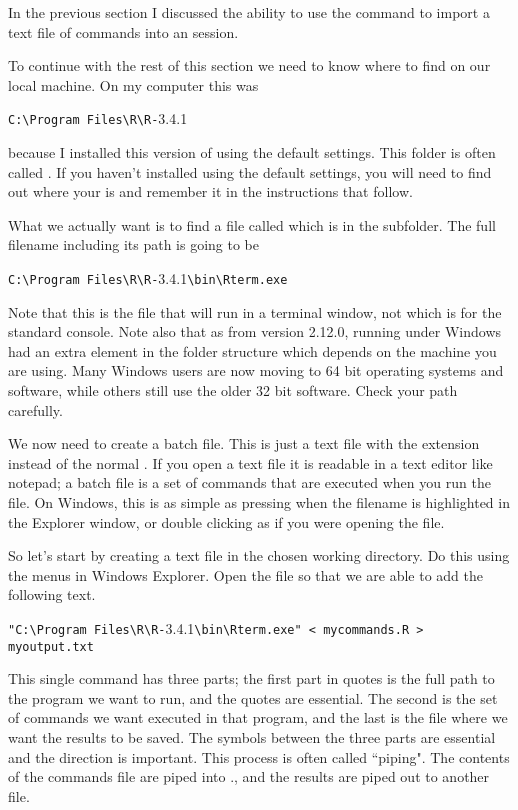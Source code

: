 In the previous section I discussed the ability to use the  command to import a text file of commands into an \R{} session. 
 
To continue with the rest of this section we need to know where to find \R{} on our local machine. On my computer this was \begin{center} \verb+C:\Program Files\R\R-+3.4.1 
\end{center} 
 because I installed this version of \R{} using the default settings. This folder is often called \RHome{}. If you haven't installed \R{} using the default settings, you will need to find out where your \RHome{} is and remember it in the instructions that follow. 
 
What we actually want is to find a file called  which is in the  subfolder. The full filename including its path is going to be \begin{center}\verb+C:\Program Files\R\R-+3.4.1\verb+\bin\Rterm.exe+\end{center} Note that this is the file that will run \R{} in a terminal window, not  which is for the standard \R{} console. Note also that as from version 2.12.0, \R{} running under Windows had an extra element in the folder structure which depends on the machine you are using. Many Windows users are now moving to 64 bit operating systems and software, while others still use the older 32 bit software. Check your path carefully. 
 
We now need to create a batch file. This is just a text file with the extension  instead of the normal . If you open a text file it is readable in a text editor like notepad; a batch file is a set of commands that are executed when you run the file. On Windows, this is as simple as pressing  when the filename is highlighted in the Explorer window, or double clicking as if you were opening the file. 
 
So let's start by creating a text file in the chosen working directory. Do this using the menus in Windows Explorer. Open the file so that we are able to add the following text.  
\begin{center} 
\verb+"C:\Program Files\R\R-+3.4.1\verb+\bin\Rterm.exe" < mycommands.R > myoutput.txt+ 
\end{center} 
 
This single command has three parts; the first part in quotes is the full path to the program we want to run, and the quotes are essential. The second is the set of commands we want executed in that program, and the last is the file where we want the results to be saved. The symbols between the three parts are essential and the direction is important. This process is often called ``piping". The contents of the commands file are piped into \R{}., and the results are piped out to another file. 
 
